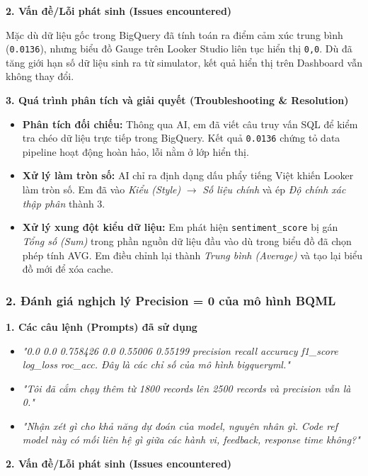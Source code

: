 \textbf{2. Vấn đề/Lỗi phát sinh (Issues encountered)}

Mặc dù dữ liệu gốc trong BigQuery đã tính toán ra điểm cảm xúc trung bình (\texttt{0.0136}), nhưng biểu đồ Gauge trên Looker Studio liên tục hiển thị \texttt{0,0}. Dù đã tăng giới hạn số dữ liệu sinh ra từ simulator, kết quả hiển thị trên Dashboard vẫn không thay đổi.

\textbf{3. Quá trình phân tích và giải quyết (Troubleshooting \& Resolution)}

\begin{itemize}
    \item \textbf{Phân tích đối chiếu:} Thông qua AI, em đã viết câu truy vấn SQL để kiểm tra chéo dữ liệu trực tiếp trong BigQuery. Kết quả \texttt{0.0136} chứng tỏ data pipeline hoạt động hoàn hảo, lỗi nằm ở lớp hiển thị.
    \item \textbf{Xử lý làm tròn số:} AI chỉ ra định dạng dấu phẩy tiếng Việt khiến Looker làm tròn số. Em đã vào \textit{Kiểu (Style)} $\rightarrow$ \textit{Số liệu chính} và ép \textit{Độ chính xác thập phân} thành 3.
    \item \textbf{Xử lý xung đột kiểu dữ liệu:} Em phát hiện \texttt{sentiment\_score} bị gán \textit{Tổng số (Sum)} trong phần nguồn dữ liệu đầu vào dù trong biểu đồ đã chọn phép tính AVG. Em điều chỉnh lại thành \textit{Trung bình (Average)} và tạo lại biểu đồ mới để xóa cache.
\end{itemize}

\subsubsection{2. Đánh giá nghịch lý Precision = 0 của mô hình BQML}

\textbf{1. Các câu lệnh (Prompts) đã sử dụng}

\begin{itemize}
    \item \textit{"0.0 0.0 0.758426 0.0 0.55006 0.55199 precision recall accuracy f1\_score log\_loss roc\_acc. Đây là các chỉ số của mô hình bigqueryml."}
    \item \textit{"Tôi đã cắm chạy thêm từ 1800 records lên 2500 records và precision vẫn là 0."}
    \item \textit{"Nhận xét gì cho khả năng dự đoán của model, nguyên nhân gì. Code ref model này có mối liên hệ gì giữa các hành vi, feedback, response time không?"}
\end{itemize}

\textbf{2. Vấn đề/Lỗi phát sinh (Issues encountered)}

